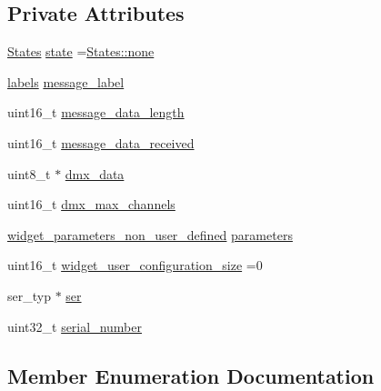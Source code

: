 \subsection*{Private Attributes}
\begin{DoxyCompactItemize}
\item 
\hyperlink{classDMXPro_1_1Processor_ab5c1e3e1ccd6dd60b9e05c3438341a24}{States} \hyperlink{classDMXPro_1_1Processor_a1b0ea97d2f76042a9c5c65d6fbb88df0}{state} =\hyperlink{classDMXPro_1_1Processor_ab5c1e3e1ccd6dd60b9e05c3438341a24a334c4a4c42fdb79d7ebc3e73b517e6f8}{States\+::none}
\item 
\hyperlink{namespaceDMXPro_a001319de95203723f1bd253fec3186cd}{labels} \hyperlink{classDMXPro_1_1Processor_a7cda5025516aa2cdf2fdab4928652678}{message\+\_\+label}
\item 
uint16\+\_\+t \hyperlink{classDMXPro_1_1Processor_a240aa5037cd16241045aa59cf7778924}{message\+\_\+data\+\_\+length}
\item 
uint16\+\_\+t \hyperlink{classDMXPro_1_1Processor_a1ac91fd49f9650bc45ee1a1ad8e5f39f}{message\+\_\+data\+\_\+received}
\item 
uint8\+\_\+t $\ast$ \hyperlink{classDMXPro_1_1Processor_a0dc6a66e64a393c6ca41f0d596edca3b}{dmx\+\_\+data}
\item 
uint16\+\_\+t \hyperlink{classDMXPro_1_1Processor_a1286b3edd8b9eea1c27853ac48c3845f}{dmx\+\_\+max\+\_\+channels}
\item 
\hyperlink{structDMXPro_1_1widget__parameters__non__user__defined}{widget\+\_\+parameters\+\_\+non\+\_\+user\+\_\+defined} \hyperlink{classDMXPro_1_1Processor_ab862c9d44d1abdcd029d0d47da7e928d}{parameters}
\item 
uint16\+\_\+t \hyperlink{classDMXPro_1_1Processor_a45fb005d1d5aa98896a8a29362f5a7e8}{widget\+\_\+user\+\_\+configuration\+\_\+size} =0
\item 
ser\+\_\+typ $\ast$ \hyperlink{classDMXPro_1_1Processor_afad2bc7129dfc3e1f039af5ae0243802}{ser}
\item 
uint32\+\_\+t \hyperlink{classDMXPro_1_1Processor_ab3573fe1aa615ec51dfd826c7f2747f9}{serial\+\_\+number}
\end{DoxyCompactItemize}


\subsection{Member Enumeration Documentation}
\mbox{\label{classDMXPro_1_1Processor_ab5c1e3e1ccd6dd60b9e05c3438341a24}} 
